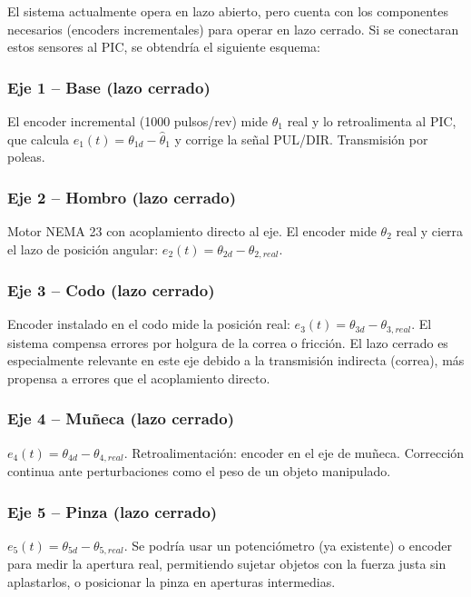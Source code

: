 \documentclass[11pt]{article}
\begin{document}
El sistema actualmente opera en lazo abierto, pero cuenta con los componentes necesarios (encoders incrementales) para operar en lazo cerrado. Si se conectaran estos sensores al PIC, se obtendría el siguiente esquema:

\subsubsection{Eje 1 – Base (lazo cerrado)}

El encoder incremental (1000 pulsos/rev) mide $\theta_1$ real y lo retroalimenta al PIC, que calcula $e_1(t) = \theta_{1d} - \hat{\theta}_1$ y corrige la señal PUL/DIR. Transmisión por poleas.

\subsubsection{Eje 2 – Hombro (lazo cerrado)}

Motor NEMA 23 con acoplamiento directo al eje. El encoder mide $\theta_2$ real y cierra el lazo de posición angular: $e_2(t) = \theta_{2d} - \theta_{2,real}$.

\subsubsection{Eje 3 – Codo (lazo cerrado)}

Encoder instalado en el codo mide la posición real: $e_3(t) = \theta_{3d} - \theta_{3,real}$. El sistema compensa errores por holgura de la correa o fricción. El lazo cerrado es especialmente relevante en este eje debido a la transmisión indirecta (correa), más propensa a errores que el acoplamiento directo.

\subsubsection{Eje 4 – Muñeca (lazo cerrado)}

$e_4(t) = \theta_{4d} - \theta_{4,real}$. Retroalimentación: encoder en el eje de muñeca. Corrección continua ante perturbaciones como el peso de un objeto manipulado.

\subsubsection{Eje 5 – Pinza (lazo cerrado)}

$e_5(t) = \theta_{5d} - \theta_{5,real}$. Se podría usar un potenciómetro (ya existente) o encoder para medir la apertura real, permitiendo sujetar objetos con la fuerza justa sin aplastarlos, o posicionar la pinza en aperturas intermedias.
\end{document}
